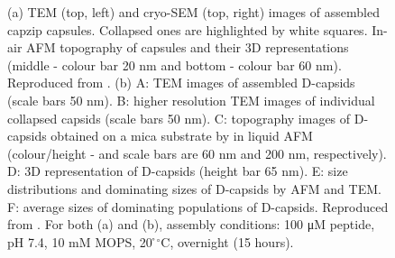 \begin{figure}
\begin{center}
 \hspace{0.3cm}
\caption[Miscoscopy experiments results on capzip capsules]{(a) TEM (top, left) and cryo-SEM (top, right) images of assembled capzip capsules. Collapsed ones are highlighted by white squares. In-air AFM topography of capsules and their 3D representations (middle - colour bar 20 nm and bottom - colour bar 60 nm). Reproduced from \citet{Castelletto2016}. (b) A: TEM images of assembled D-capsids (scale bars 50 nm). B: higher resolution TEM images of individual collapsed capsids (scale bars 50 nm). C: topography images of D-capsids obtained on a mica substrate by in liquid AFM (colour/height - and scale bars are 60 nm and 200 nm, respectively). D: 3D representation of D-capsids (height bar 65 nm). E: size distributions and dominating sizes of D-capsids by AFM and TEM. F: average sizes of dominating populations of D-capsids. Reproduced from \citet{Kepiro2019}. For both (a) and (b), assembly conditions: 100 μM peptide, pH 7.4, 10 mM MOPS, 20 ̊$^{\circ}$C, overnight (15 hours).} \label{fig:exp_structure}
\end{center}
\end{figure}

